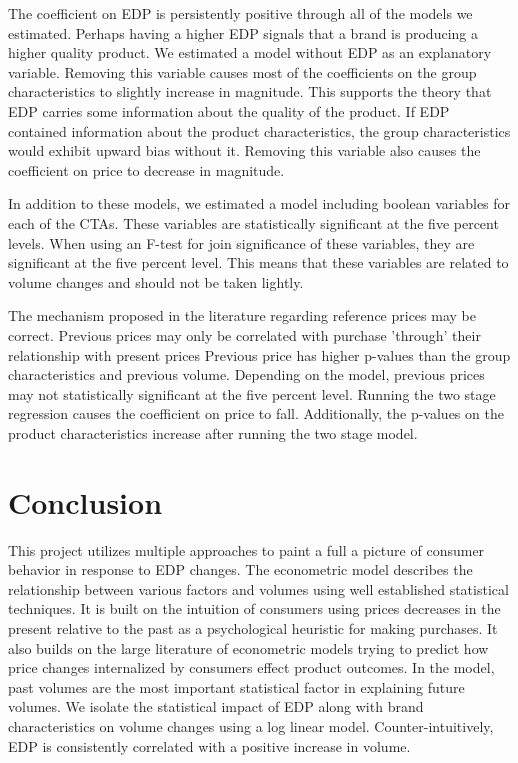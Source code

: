 \documentclass{article}
\begin{document}
The coefficient on EDP is persistently positive through all of the models we estimated. Perhaps having a higher EDP signals that a brand is producing a higher quality product. We estimated a model without EDP as an explanatory variable. Removing this variable causes most of the coefficients on the group characteristics to slightly increase in magnitude. This supports the theory that EDP carries some information about the quality of the product. If EDP contained information about the product characteristics, the group characteristics would exhibit upward bias without it. Removing this variable also causes the coefficient on price to decrease in magnitude.

In addition to these models, we estimated a model including boolean variables for each of the CTAs. These variables are statistically significant at the five percent levels. When using an F-test for join significance of these variables, they are significant at the five percent level. This means that these variables are related to volume changes and should not be taken lightly. 

The mechanism proposed in the literature regarding reference prices may be correct. Previous prices may only be correlated with purchase 'through' their relationship with present prices Previous price has higher p-values than the group characteristics and previous volume. Depending on the model, previous prices may not statistically significant at the five percent level. Running the two stage regression causes the coefficient on price to fall. Additionally, the p-values on the product characteristics increase after running the two stage model.

\section{Conclusion}

This project utilizes multiple approaches to paint a full a picture of consumer behavior in response to EDP changes. The econometric model describes the relationship between various factors and volumes using well established statistical techniques. It is built on the intuition of consumers using prices decreases in the present relative to the past as a psychological heuristic for making purchases. It also builds on the large literature of econometric models trying to predict how price changes internalized by consumers effect product outcomes. In the model, past volumes are the most important statistical factor in explaining future volumes. We isolate the statistical impact of EDP along with brand characteristics on volume changes using a log linear model. Counter-intuitively, EDP is consistently correlated with a positive increase in volume.
\end{document}
